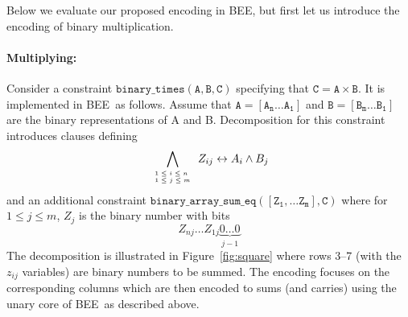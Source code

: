 \documentclass[runningheads,a4paper]{llncs}
\newcommand{\bee}{\textsf{BEE}}
\begin{document}
Below we evaluate our proposed encoding in \bee, but first let us
introduce the encoding of binary multiplication.




\paragraph{\bf Multiplying:~~}

Consider a constraint $\mathtt{binary\_times(A,B,C)}$ specifying that
$\mathtt{C=A\times B}$. It is implemented in \bee\ as follows.  Assume
that $\mathtt{A=[A_n\ldots A_1]}$ and $\mathtt{B=[B_m\ldots B_1]}$ are
the binary representations of A and B.  Decomposition for this
constraint introduces clauses defining
\begin{equation}
  \label{eq:sq}
  \bigwedge_{\tiny{
  \begin{array}{l}
    1\leq i\leq n\\  1\leq j\leq m
  \end{array}}
  } Z_{ij}\leftrightarrow A_i\wedge B_j
\end{equation}
and an additional constraint
$
\mathtt{binary\_array\_sum\_eq([Z_1,\ldots Z_m],C)}
$
where for $1\leq j\leq m$, $Z_j$ is the binary number with
bits \[Z_{nj}\ldots Z_{1j} \underbrace{0\ldots 0}_{j-1}\]
The decomposition is illustrated in
Figure~\ref{fig:square} where rows 3--7 (with the
$z_{ij}$ variables) are binary numbers to be summed. The encoding
focuses on the corresponding columns which are then encoded to sums
(and carries) using the unary core of \bee\ as described above.
\end{document}
